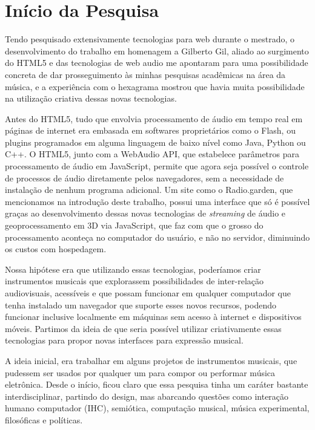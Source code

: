 

\section{Início da Pesquisa}

    Tendo pesquisado extensivamente tecnologias para web durante o mestrado, o desenvolvimento do trabalho em homenagem a Gilberto Gil, aliado ao surgimento do HTML5 e das tecnologias de web audio me apontaram para uma possibilidade concreta de dar prosseguimento às minhas pesquisas acadêmicas na área da música, e a experiência com o hexagrama mostrou que havia muita possibilidade na utilização criativa dessas novas tecnologias. 

Antes do HTML5, tudo que envolvia processamento de áudio em tempo real em páginas de internet era embasada em softwares proprietários como o Flash, ou plugins programados em alguma linguagem de baixo nível como Java, Python ou C++. O HTML5, junto com a WebAudio API, que estabelece parâmetros para processamento de áudio em JavaScript, permite que agora seja possível o controle de processos de áudio diretamente pelos navegadores, sem a necessidade de instalação de nenhum programa adicional. Um site como o Radio.garden, que mencionamos na introdução deste trabalho, possui uma interface que só é possível graças ao desenvolvimento dessas novas tecnologias de \emph{streaming} de áudio e geoprocessamento em 3D via JavaScript, que faz com que o grosso do processamento aconteça no computador do usuário, e não no servidor, diminuindo os custos com hospedagem.

Nossa hipótese era que utilizando essas tecnologias, poderíamos criar instrumentos musicais que explorassem possibilidades de inter-relação audiovisuais, acessíveis e que possam funcionar em qualquer computador que tenha instalado um navegador que suporte esses novos recursos, podendo funcionar inclusive localmente em máquinas sem acesso à internet e dispositivos móveis. Partimos da ideia de que seria possível utilizar criativamente essas tecnologias para propor novas interfaces para expressão musical.
    
A ideia inicial, era trabalhar em alguns projetos de instrumentos musicais, que pudessem ser usados por qualquer um para compor ou performar música eletrônica. Desde o início, ficou claro que essa pesquisa tinha um caráter bastante interdisciplinar, partindo do design, mas abarcando questões como interação humano computador (IHC), semiótica, computação musical, música experimental, filosóficas e políticas.

